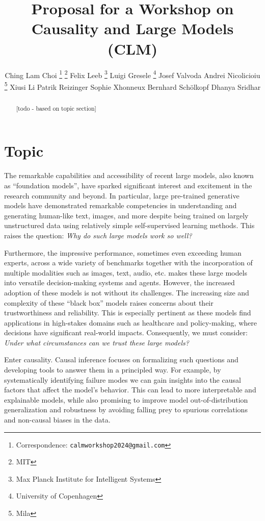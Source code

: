 \documentclass{article}
\title{Proposal for a Workshop on \\
Causality and Large Models (C\emoji{heart}LM)}
\author{%
    Ching Lam Choi \thanks{Correspondence: \texttt{calmworkshop2024@gmail.com}} \thanks{MIT}
    \And
    Felix Leeb \footnotemark[1] \thanks{Max Planck Institute for Intelligent Systems}
    \And
    Luigi Gresele \thanks{University of Copenhagen}
    \And
    Josef Valvoda \footnotemark[4]
    \And
    Andrei Nicolicioiu \thanks{Mila}
    \And
    Xiusi Li \footnotemark[5]
    \And
    Patrik Reizinger \footnotemark[3]
    \And
    Sophie Xhonneux \footnotemark[5]
    \And
    Bernhard Schölkopf \footnotemark[3]
    \And
    Dhanya Sridhar \footnotemark[5]
}
\begin{document}
\maketitle


\begin{abstract}
[todo - based on topic section]
\end{abstract}



\section{Topic}

The remarkable capabilities and accessibility of recent large models, also known as ``foundation models'', have sparked significant interest and excitement in the research community and beyond. In particular, large pre-trained generative models have demonstrated remarkable competencies in understanding and generating human-like text, images, and more despite being trained on largely unstructured data using relatively simple self-supervised learning methods. This raises the question: \textit{Why do such large models work so well?} %

Furthermore, the impressive performance, sometimes even exceeding human experts, across a wide variety of benchmarks together with the incorporation of multiple modalities such as images, text, audio, etc. makes these large models into versatile decision-making systems and agents.
However, the increased adoption of these models is not without its challenges. The increasing size and complexity of these ``black box'' models raises concerns about their trustworthiness and reliability.
This is especially pertinent as these models find applications in high-stakes domains such as healthcare and policy-making, where decisions have significant real-world impacts.
Consequently, we must consider: \textit{Under what circumstances can we trust these large models?} %

Enter causality. Causal inference focuses on formalizing such questions and developing tools to answer them in a principled way. For example, by systematically identifying failure modes 
we can gain insights into the causal factors that affect the model's behavior. 
This can lead to more interpretable and explainable models, while also promising to improve model out-of-distribution generalization and robustness by avoiding falling prey to spurious correlations and non-causal biases in the data.
\end{document}
